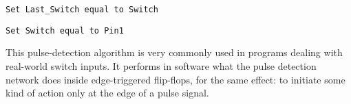 \hskip 10pt {\tt Set Last\_Switch equal to Switch}

\hskip 10pt {\tt Set Switch equal to Pin1}







This pulse-detection algorithm is very commonly used in programs dealing with real-world switch inputs.  It performs in software what the pulse detection network does inside edge-triggered flip-flops, for the same effect: to initiate some kind of action only at the edge of a pulse signal.





